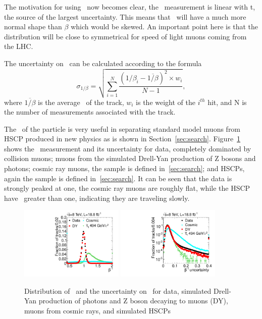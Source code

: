 The motivation for using \invbeta\ now becomes clear, the \invbeta\ measurement
is linear with t, the source of the largest uncertainty. This means that \invbeta\ will have a much more normal shape than $\beta$ which would be skewed.
An important point here is that the distribution will be close to symmetrical for speed of light muons coming from the LHC.

The uncertainty on \invbeta\ can be calculated according to the formula
\begin{equation}
 \sigma_{1/\beta} = \sqrt{\sum_{i=1}^N \frac{(1/\beta_i - \overline{1/\beta})^2 \times w_{i}}{N-1}},
 \label{betaerr}
\end{equation}
where $\overline{1/\beta}$ is the average \invbeta\ of the track, $w_{i}$ is the weight of the $i^{th}$ hit, and N is the number of measurements associated with the track.

The \invbeta\ of the particle is very useful in separating standard model muons from HSCP produced in new physics as is shown in Section~\ref{sec:search}.
Figure~\ref{fig:invbeta} shows the \invbeta\ measurement and its uncertainty for data, completely dominated by collision muons; 
muons from the simulated Drell-Yan production of Z bosons and photons; cosmic ray muons, the sample is defined in~\ref{sec:search};
and HSCPs, again the sample is defined in~\ref{sec:search}. It can be seen that the data is strongly peaked at one, the cosmic ray muons are roughly flat, while
the HSCP have \invbeta\ greater than one, indicating they are traveling slowly.

\begin{figure}
  \begin{center}
      \includegraphics[width=0.44\textwidth]{figures/timing/TOF}
      \includegraphics[width=0.44\textwidth]{figures/timing/TOFErr} \\
      \renewcommand\baselinestretch{1}\caption[Gluino1200f100 System Pt vs MET]
      {Distribution of \invbeta\ and the uncertainty on \invbeta\ for data,
simulated Drell-Yan production of photons and Z boson decaying to muons (DY), muons from cosmic rays, and simulated HSCPs
        }
      \renewcommand\baselinestretch{\@spacing}
      \label{fig:invbeta}
  \end{center}
\end{figure}


